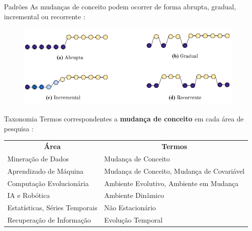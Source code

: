 \documentclass[10pt]{beamer}
\begin{document}
\begin{frame}{Padrões}
    As mudanças de conceito podem ocorrer de forma abrupta, gradual, incremental ou recorrente \cite{Gama:2014:SCD:2597757.2523813}:

    \begin{figure}[H]
    \begin{center}
        \includegraphics[scale=0.5]{imagens/concept_drift_patterns.png}
    \end{center}
    \end{figure}
\end{frame}

\begin{frame}{Taxonomia}
    Termos correspondentes a \textbf{mudança de conceito} em cada área de pesquisa \cite{Zliobaite:2010}:

    \begin{center} 
    \begin{table}[H]
    \label{tbl:taxonomy}
    \begin{tabularx}{\textwidth}{|l|X|}
    \cline{1-2}
    \multicolumn{1}{|c|}{\textbf{Área}} & \multicolumn{1}{c|}{\textbf{Termos}}       \\ \cline{1-2}
    Mineração de Dados                  & Mudança de Conceito                        \\ \cline{1-2}
    Aprendizado de Máquina              & Mudança de Conceito, Mudança de Covariável \\ \cline{1-2}
    Computação Evolucionária            & Ambiente Evolutivo, Ambiente em Mudança    \\ \cline{1-2}
    IA e Robótica                       & Ambiente Dinâmico                          \\ \cline{1-2}
    Estatísticas, Séries Temporais      & Não Estacionário                           \\ \cline{1-2}
    Recuperação de Informação           & Evolução Temporal                          \\ \cline{1-2}
    \end{tabularx}
    
    \end{table}
    \end{center}
\end{frame}
\end{document}
